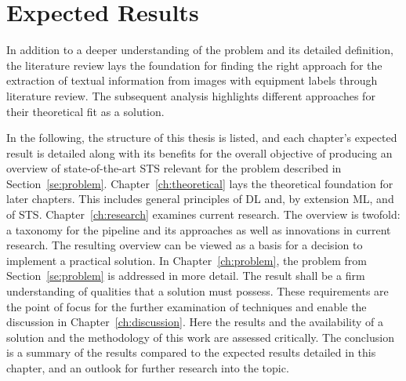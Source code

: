 \section{Expected Results}
In addition to a deeper understanding of the problem and its detailed definition, the literature
review lays the foundation for finding the right approach for the extraction of textual
information from images with equipment labels through literature review.
The subsequent analysis highlights different approaches for their theoretical fit as a
solution.

In the following, the structure of this thesis is listed, and each chapter's expected
result is detailed along with its benefits for the overall objective of producing an overview of
state-of-the-art \ac{STS} relevant for the problem described in Section~\ref{se:problem}.
Chapter~\ref{ch:theoretical} lays the theoretical foundation for later chapters.
This includes general principles of \ac{DL} and, by extension \ac{ML}, and of \ac{STS}.
Chapter~\ref{ch:research} examines current research.
The overview is twofold: a taxonomy for the pipeline and its approaches as well as innovations in
current research.
The resulting overview can be viewed as a basis for a decision to implement a
practical solution.
In Chapter~\ref{ch:problem}, the problem from Section~\ref{se:problem} is addressed in more detail.
The result shall be a firm understanding of qualities that a solution must possess.
These requirements are the point of focus for the further examination of techniques and
enable the discussion in Chapter~\ref{ch:discussion}.
Here the results and the availability of a solution and the methodology of this work
are assessed critically.
The conclusion is a summary of the results compared to the expected results detailed in this chapter,
and an outlook for further research into the topic.
